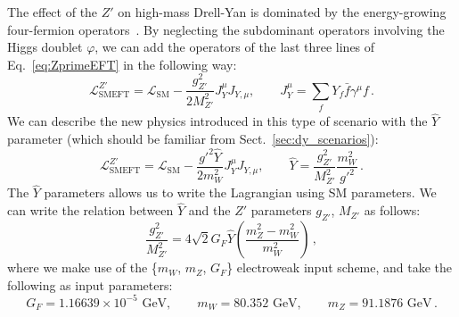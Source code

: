 \documentclass[withindex,glossary]{cam-thesis}
\begin{document}
The effect of the $Z'$ on high-mass Drell-Yan is dominated by the energy-growing four-fermion operators~\cite{Farina:2016rws,Torre:2020aiz,Panico:2021vav}.
By neglecting the subdominant operators involving the Higgs doublet $\varphi$,
we can add the operators of the last three lines of Eq.~\eqref{eq:ZprimeEFT} in the following way:
%
\begin{equation}
\label{eq:zprimeL}
	\mathcal{L}^{Z'}_{\text{SMEFT}} = \mathcal{L}_{\text{SM}} -\frac{g_{Z'}^{2}}{2 M_{Z'}^{2}} J^{\mu}_Y J_{Y, \mu}, \qquad J^{\mu}_Y = \sum_{\substack{f}} Y_{f} \bar{f} \gamma^{\mu} f \, .
\end{equation}
%
We can describe the new physics introduced in this type of scenario with the $\hat{Y}$ parameter (which should be familiar from Sect.~\ref{sec:dy_scenarios}):
%
\begin{equation}
	\mathcal{L}^{Z'}_{\text{SMEFT}} = \mathcal{L}_{\text{SM}} -\frac{{g'}^2 \hat{Y}}{2 m^2_W} J^{\mu}_Y J_{Y, \mu}, \qquad \hat{Y} = \frac{g_{Z'}^{2}}{M_{Z'}^{2}} \frac{m^2_W}{{g'}^2} \, .
\end{equation}
%
The $\hat{Y}$ parameters allows us to write the Lagrangian using SM parameters. We can write the relation between $\hat{Y}$ and the $Z'$ parameters $g_{Z'}$, $M_{Z'}$ as follows:
%
\begin{equation}
	\frac{g_{Z'}^{2}}{M_{Z'}^{2}} = 4 \sqrt{2} G_{F} \hat{Y} \left( \frac{m_{Z}^{2} - m_{W}^{2}}{m_{W}^{2}}  \right) \, ,
\end{equation}
where we make use of the \{$m_W$, $m_Z$, $G_F$\} electroweak input scheme, and take the following as input parameters:
%
%
%
%
\begin{equation}
	G_{F} = 1.16639 \times 10^{-5} \text{ GeV}, \qquad m_{W} = 80.352 \text{ GeV}, \qquad m_{Z} = 91.1876 \text{ GeV} \, .
\end{equation}
%
\end{document}
